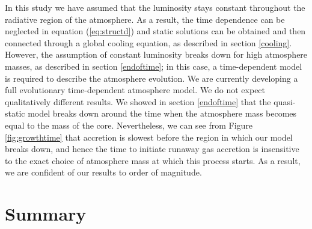 \documentclass[apj]{emulateapj}
\newcommand{\delad}{\nabla_{\rm ad}}
\begin{document}
 In this study we have assumed that the luminosity stays constant throughout the radiative region of the atmosphere. As a result, the time dependence can be neglected in equation (\ref{eq:structd}) and static solutions can be obtained and then connected through a global cooling equation, as described in section \ref{cooling}. However, the assumption of constant luminosity breaks down for high atmosphere masses, as described in section \ref{endoftime}; in this case, a time-dependent model is required to describe the atmosphere evolution. We are currently developing a full evolutionary time-dependent atmosphere model. We do not expect qualitatively different results. We showed in section \ref{endoftime} that the quasi-static model breaks down around the time when the atmosphere mass becomes equal to the mass of the core. Nevertheless, we can see from Figure \ref{fig:growthtime} that accretion is slowest before the region in which our model breaks down, and hence the time to initiate runaway gas accretion is insensitive to the exact choice of atmosphere mass at which this process starts. As a result, we are confident of our results to order of magnitude.
 
 


 
 
 \section{Summary}
 \label{conclusions}
 
\end{document}
